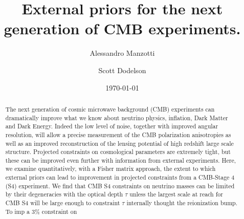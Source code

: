 \documentclass[aps,prd,reprint,superscriptaddress]{revtex4-1}
\begin{document}
\graphicspath{{images/}}

\title{External priors for the next generation of CMB experiments.}

\author{Alessandro Manzotti}
\author{Scott Dodelson}


\date{\today}
\begin{abstract}
The next generation of cosmic microwave background (CMB) experiments can dramatically improve what we know about neutrino physics, inflation, Dark Matter and Dark Energy. 
Indeed the low level of noise, together with improved angular resolution, will allow a precise measurement of the CMB polarization anisotropies as well as an improved reconstruction of the lensing potential of high redshift large scale structure. 
Projected constraints on cosmological parameters are extremely tight, but these can be improved even further with information from external experiments. Here, we examine quantitatively, with a Fisher matrix approach, the extent to which external priors can lead to improvement in projected constraints from a CMB-Stage 4 (S4) experiment.
We find that CMB S4 constraints on neutrino masses can be limited by their degeneracies with the optical depth $\tau$ unless the largest scale at reach for CMB S4 will be large enough to constraint $\tau$ internally thought the reionization bump. To imp a $3\%$ constraint on 
\end{abstract}

\pacs{}
\maketitle
\end{document}

